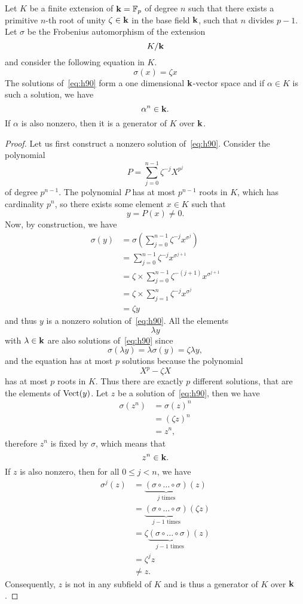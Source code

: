 \begin{prop}
  \label{prop:h90}
  Let $K$ be a finite extension of $\mathbf{k}=\mathbb{F}_p$ of degree $n$ such that there exists a
primitive $n$-th root of unity $\zeta\in\mathbf{k}$ in the base field $\mathbf{k}$, \ie such
that $n$ divides $p-1$. 
 Let $\sigma$ be the Frobenius automorphism of the extension
 \[
   K/\mathbf{k}
 \]
 and consider the following equation in $K$.
 \begin{equation}
   \tag{H90}
   \sigma(x) = \zeta x
   \label{eq:h90}
 \end{equation}
The solutions of~\eqref{eq:h90} form a one dimensional $\mathbf{k}$-vector space and if
$\alpha\in K$ is such a solution, we have
\[
  \alpha^n\in\mathbf{k}.
\]
If $\alpha$ is also nonzero, then it is a generator of $K$ over $\mathbf{k}$.
\end{prop}
\begin{proof}
  Let us first construct a nonzero solution of~\eqref{eq:h90}. Consider the polynomial
  \[
    P = \sum_{j=0}^{n-1}\zeta^{-j} X^{p^j}
  \]
  of degree $p^{n-1}$. The polynomial $P$ has at most $p^{n-1}$ roots in $K$,
  which has cardinality $p^n$, so there exists some element $x\in K$ such that
  \[
    y = P(x)\neq0.
  \]
  Now, by construction, we have
  \begin{align*}
    \sigma(y) &= \sigma(\sum_{j=0}^{n-1}\zeta^{-j}x^{\sigma^{j}})\\
    &= \sum_{j=0}^{n-1}\zeta^{-j}x^{\sigma^{j+1}}\\
    &= \zeta \times \sum_{j=0}^{n-1}\zeta^{-(j+1)}x^{\sigma^{j+1}}\\
    &= \zeta \times \sum_{j=1}^{n}\zeta^{-j}x^{\sigma^{j}}\\
    &= \zeta y
  \end{align*}
  and thus $y$ is a nonzero solution of~\eqref{eq:h90}. All the elements
  \[
    \lambda y
  \]
  with $\lambda\in\mathbf{k}$ are also solutions of~\eqref{eq:h90} since
  \[
    \sigma(\lambda y) = \lambda\sigma(y) = \zeta\lambda y,
  \]
  and the equation has at most $p$ solutions because the polynomial
  \[
    X^p - \zeta X
  \]
  has at most $p$ roots in $K$. Thus there are exactly $p$ different solutions,
  that are the elements of $\operatorname{Vect}(y)$. Let $z$ be a solution of~\eqref{eq:h90},
  then we have
  \begin{align*}
   \sigma(z^n) &= \sigma(z)^n\\
   &= (\zeta z)^n\\
   &= z^n,
  \end{align*}
  therefore $z^n$ is fixed by $\sigma$, which means that
  \[
    z^n\in\mathbf{k}.
  \]
  If $z$ is also nonzero, then for all $0\leq j<n$, we have
  \begin{align*}
    \sigma^j(z) &= \underbrace{(\sigma\circ\dots\circ\sigma)}_{j\text{ times}}(z)\\
    &= \underbrace{(\sigma\circ\dots\circ\sigma)}_{j-1\text{ times}}(\zeta z)\\
    &= \zeta\underbrace{(\sigma\circ\dots\circ\sigma)}_{j-1\text{ times}}(z)\\
    &= \zeta^j z\\
    &\neq z.
  \end{align*}
  Consequently, $z$ is not in any subfield of $K$ and is thus a generator of $K$
  over $\mathbf{k}$.
\end{proof}
